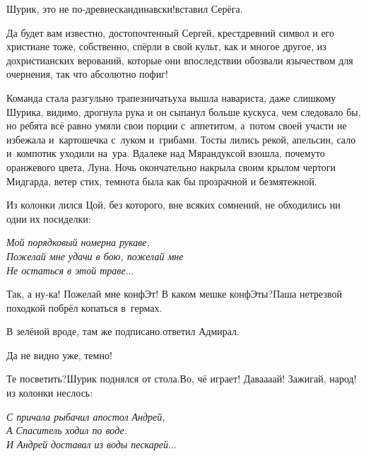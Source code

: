 \diagdash Шурик, это не по-древнескандинавски!\mdash вставил Серёга.

\diagdash Да будет вам известно, достопочтенный Сергей, крест\mdash древний символ и его христиане тоже, собственно, спёрли в свой культ, как и многое другое, из дохристианских верований, которые они впоследствии обозвали язычеством для очернения, так что абсолютно пофиг!

Команда стала разгульно трапезничать\mdash уха вышла навариста, даже слишком\mdash у Шурика, видимо, дрогнула рука и он сыпанул больше кус\sdash куса, чем следовало бы, но ребята всё равно умяли свои порции с~аппетитом, а~потом своей участи не избежала и~картошечка с~луком и~грибами. Тосты лились рекой, апельсин, сало и~компотик уходили на~ура. Вдалеке над Мярандуксой взошла, почему\sdash то оранжевого цвета, Луна. Ночь окончательно накрыла своим крылом чертоги Мидгарда, ветер стих, темнота была как бы прозрачной и безмятежной.

Из колонки лился Цой, без которого, вне всяких сомнений, не обходились ни одни их посиделки:

\vspace{0.2cm}
\noindent\textit{%
	\hspace*{2.0cm}Мой порядковый номер\mdash на рукаве,\\	
	\hspace*{2.0cm}Пожелай мне удачи в бою, пожелай мне\\
	\hspace*{2.0cm}Не остаться в этой траве$\ldots$
}
\vspace{0.2cm}

\diagdash Так, а ну-ка! Пожелай мне конфЭт! В каком мешке конфЭты?\mdash Паша нетрезвой походкой побрёл копаться в~гермах.

\diagdash В зелёной вроде, там же подписано.\mdash ответил Адмирал.

\diagdash Да не видно уже, темно!

\diagdash Те посветить?\mdash Шурик поднялся от стола.\mdash Во, чё играет! Дава\sdash а\sdash а\sdash ай! Зажигай, народ!\mdash из колонки неслось:

\vspace{0.2cm}
\noindent\textit{%
	\hspace*{2.5cm}С причала рыбачил апостол Андрей,\\	
	\hspace*{2.5cm}А Спаситель ходил по воде.\\
	\hspace*{2.5cm}И Андрей доставал из воды пескарей$\ldots$	
}
\vspace{0.2cm}

